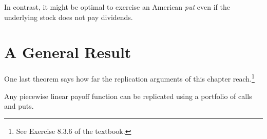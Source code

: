 In contrast, it might be optimal to exercise an American \emph{put} even if the underlying stock does not pay dividends.

\section{A General Result}
\label{sec:replication}


One last theorem says how far the replication arguments of this chapter reach.\footnote{See Exercise 8.3.6 of the textbook.}

\begin{theorem}
	\label{thm:piecewise-replication}
	Any piecewise linear payoff function can be replicated using a portfolio of calls and puts.
\end{theorem}

